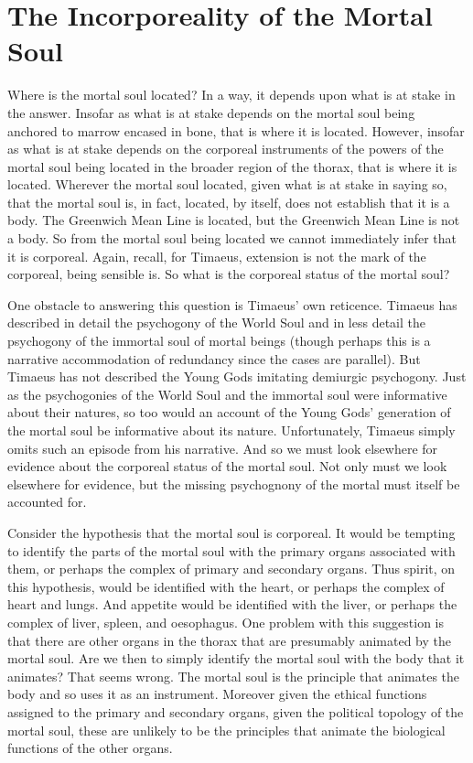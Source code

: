
\section{The Incorporeality of the Mortal Soul} %
\label{sec:the_incorporeality_of_the_mortal_soul}

Where is the mortal soul located? In a way, it depends upon what is at stake in the answer. Insofar as what is at stake depends on the mortal soul being anchored to marrow encased in bone, that is where it is located. However, insofar as what is at stake depends on the corporeal instruments of the powers of the mortal soul being located in the broader region of the thorax, that is where it is located. Wherever the mortal soul located, given what is at stake in saying so, that the mortal soul is, in fact, located, by itself, does not establish that it is a body. The Greenwich Mean Line is located, but the Greenwich Mean Line is not a body. So from the mortal soul being located we cannot immediately infer that it is corporeal. Again, recall, for Timaeus, extension is not the mark of the corporeal, being sensible is. So what is the corporeal status of the mortal soul?

One obstacle to answering this question is Timaeus' own reticence. Timaeus has described in detail the psychogony of the World Soul and in less detail the psychogony of the immortal soul of mortal beings (though perhaps this is a narrative accommodation of redundancy since the cases are parallel). But Timaeus has not described the Young Gods imitating demiurgic psychogony. Just as the psychogonies of the World Soul and the immortal soul were informative about their natures, so too would an account of the Young Gods' generation of the mortal soul be informative about its nature. Unfortunately, Timaeus simply omits such an episode from his narrative. And so we must look elsewhere for evidence about the corporeal status of the mortal soul. Not only must we look elsewhere for evidence, but the missing psychognony of the mortal must itself be accounted for.

Consider the hypothesis that the mortal soul is corporeal. It would be tempting to identify the parts of the mortal soul with the primary organs associated with them, or perhaps the complex of primary and secondary organs. Thus spirit, on this hypothesis, would be identified with the heart, or perhaps the complex of heart and lungs. And appetite would be identified with the liver, or perhaps the complex of liver, spleen, and oesophagus. One problem with this suggestion is that there are other organs in the thorax that are presumably animated by the mortal soul. Are we then to simply identify the mortal soul with the body that it animates? That seems wrong. The mortal soul is the principle that animates the body and so uses it as an instrument. Moreover given the ethical functions assigned to the primary and secondary organs, given the political topology of the mortal soul, these are unlikely to be the principles that animate the biological functions of the other organs.


